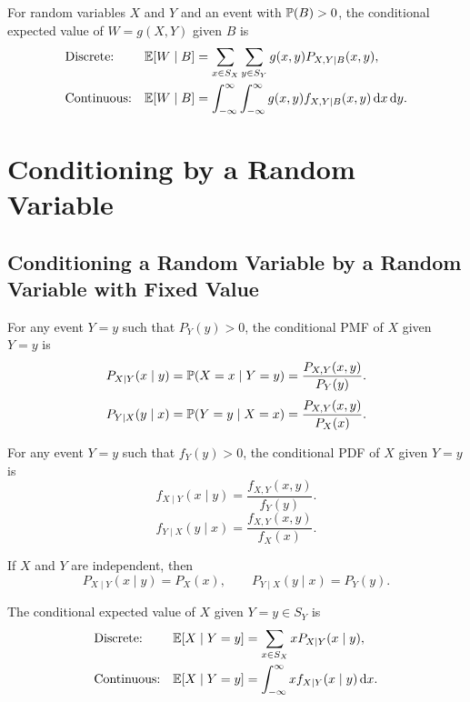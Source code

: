 \begin{definition}
    For random variables $X$ and $Y$ and an event with $\P{B}>0$, the conditional expected value of $W=g(X,Y)$ given $B$ is
    \begin{align*}
        &\text{Discrete:}& \E{W\mid B}&=\sum_{x\in S_X}\sum_{y\in S_Y}g(x,y)P_{X,Y\mid B}(x,y), \\
        &\text{Continuous:}& \E{W\mid B}&=\int_{-\infty}^{\infty}\int_{-\infty}^{\infty}g(x,y)f_{X,Y\mid B}(x,y)\diff x\diff y.
    \end{align*}
\end{definition}

\section{Conditioning by a Random Variable}
\subsection{Conditioning a Random Variable by a Random Variable with Fixed Value}
\begin{definition}
    For any event $Y=y$ such that $P_Y(y)>0$, the conditional \textnormal{PMF} of $X$ given $Y=y$ is
    \[P_{X\mid Y}(x\mid y)=\condP{X=x}{Y=y}=\frac{P_{X,Y}(x,y)}{P_Y(y)}.\]
    \[P_{Y\mid X}(y\mid x)=\condP{Y=y}{X=x}=\frac{P_{X,Y}(x,y)}{P_X(x)}.\]
\end{definition}

\begin{definition}
    \label{def:conditional_pdf}
    For any event $Y=y$ such that $f_Y(y)>0$, the conditional \textnormal{PDF} of $X$ given $Y=y$ is
    \[f_{X\mid Y}(x\mid y)=\frac{f_{X,Y}(x,y)}{f_Y(y)}.\]
    \[f_{Y\mid X}(y\mid x)=\frac{f_{X,Y}(x,y)}{f_X(x)}.\]
\end{definition}

\begin{theorem}
    If $X$ and $Y$ are independent, then
    \[P_{X\mid Y}(x\mid y)=P_X(x), \qquad P_{Y\mid X}(y\mid x)=P_Y(y).\]
\end{theorem}

\begin{definition}
    \label{def:conditional_expected_value}
    The conditional expected value of $X$ given $Y=y\in S_Y$ is
    \begin{align*}
        &\text{Discrete:}& \E{X\mid Y=y}&=\sum_{x\in S_X}xP_{X\mid Y}(x\mid y), \\
        &\text{Continuous:}& \E{X\mid Y=y}&=\int_{-\infty}^{\infty}xf_{X\mid Y}(x\mid y)\diff x.
    \end{align*}
\end{definition}

